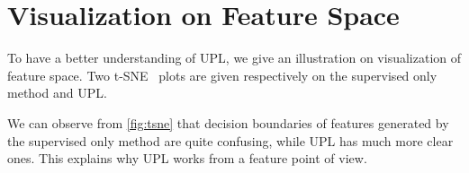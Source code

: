 \documentclass[10pt, twocolumn, letterpaper]{article}
\begin{document}
\begin{table}[t]
    \setlength{\tabcolsep}{7pt}
    \centering
    \caption{
        \textbf{Ablation study on PRT} on Cityscapes \texttt{val} set.
    }
    \label{tab:prt_city}
    \vspace{-8pt}
    \vspace{-5pt}
\end{table}


\begin{table}[t]
    \setlength{\tabcolsep}{10.5pt}
    \centering
    \caption{
        \textbf{Ablation study on } on Cityscapes \texttt{val} set.
    }
    \label{tab:alpha_city}
    \vspace{-8pt}
    \vspace{-5pt}
\end{table}


\section{Visualization on Feature Space}
\label{sec:featurespace}

To have a better understanding of UPL, we give an illustration on visualization of feature space.
Two t-SNE~\cite{tsne} plots are given respectively on the supervised only method and UPL.


We can observe from \cref{fig:tsne} that decision boundaries of features generated by the supervised only method are quite confusing, while UPL has much more clear ones.
This explains why UPL works from a feature point of view.
\end{document}
